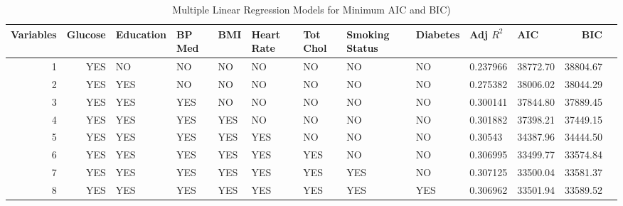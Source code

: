 \documentclass{article}\usepackage[]{graphicx}\usepackage[]{color}
\begin{document}
   \begin{table}[ht]
   \begin{scriptsize}
\centering
\begin{tabular}{rrlllllllllrr}
  \hline
  Variables & Glucose & Education & BP Med & BMI & Heart Rate & Tot Chol & Smoking Status & Diabetes & Adj $R^2$ & AIC & BIC \\ 
  \hline
  1 & YES & NO & NO & NO & NO & NO & NO & NO & 0.237966 & 38772.70 & 38804.67 \\ 
     2 & YES & YES & NO & NO & NO & NO & NO & NO & 0.275382 & 38006.02 & 38044.29 \\ 
     3 & YES & YES & YES & NO & NO & NO & NO & NO & 0.300141 & 37844.80 & 37889.45 \\ 
     4 & YES & YES & YES & YES & NO & NO & NO & NO & 0.301882 & 37398.21 & 37449.15 \\ 
     5 & YES & YES & YES & YES & YES & NO & NO & NO & 0.30543 & 34387.96 & 34444.50 \\ 
     6 & YES & YES & YES & YES & YES & YES & NO & NO & 0.306995 & 33499.77 & 33574.84 \\ 
     7 & YES & YES & YES & YES & YES & YES & YES & NO & 0.307125 & 33500.04 & 33581.37 \\ 
     8 & YES & YES & YES & YES & YES & YES & YES & YES & 0.306962 & 33501.94 & 33589.52 \\ 
   \hline
\end{tabular}
\caption{Multiple Linear Regression Models for Minimum AIC and BIC)}
\end{scriptsize}
\end{table}
\end{document}
